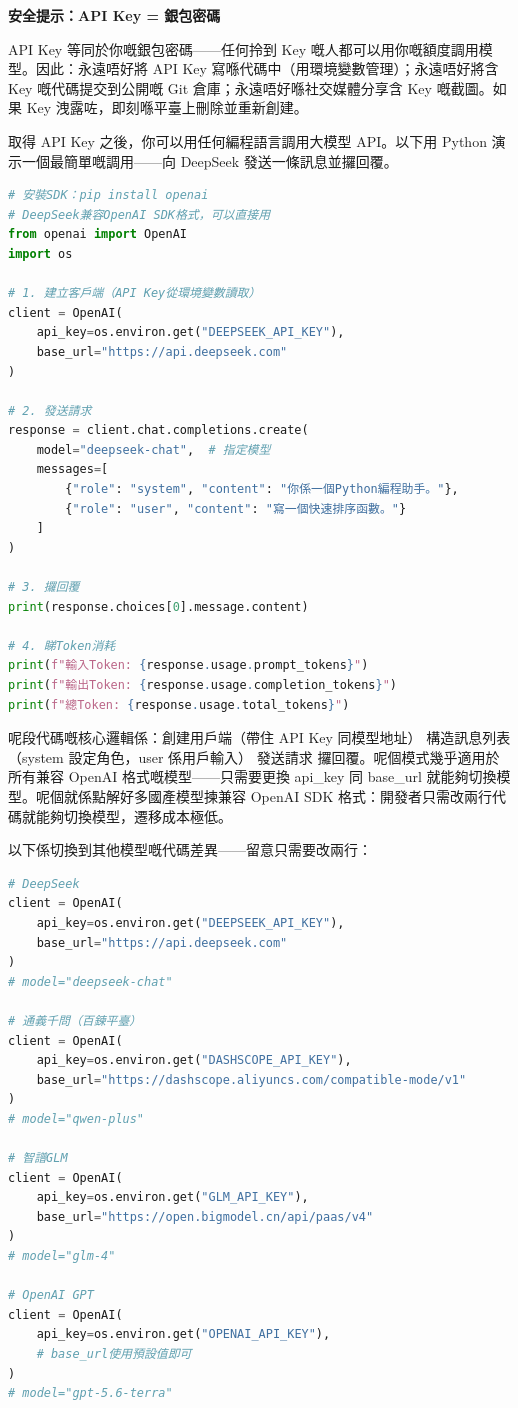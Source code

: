 \textbf{安全提示：API Key = 銀包密碼}\par

API Key 等同於你嘅銀包密碼——任何拎到 Key 嘅人都可以用你嘅額度調用模型。因此：永遠唔好將 API Key 寫喺代碼中（用環境變數管理）；永遠唔好將含 Key 嘅代碼提交到公開嘅 Git 倉庫；永遠唔好喺社交媒體分享含 Key 嘅截圖。如果 Key 洩露咗，即刻喺平臺上刪除並重新創建。


取得 API Key 之後，你可以用任何編程語言調用大模型 API。以下用 Python 演示一個最簡單嘅調用——向 DeepSeek 發送一條訊息並攞回覆。

\begin{lstlisting}[language=Python]
# 安裝SDK：pip install openai
# DeepSeek兼容OpenAI SDK格式，可以直接用
from openai import OpenAI
import os

# 1. 建立客戶端（API Key從環境變數讀取）
client = OpenAI(
    api_key=os.environ.get("DEEPSEEK_API_KEY"),
    base_url="https://api.deepseek.com"
)

# 2. 發送請求
response = client.chat.completions.create(
    model="deepseek-chat",  # 指定模型
    messages=[
        {"role": "system", "content": "你係一個Python編程助手。"},
        {"role": "user", "content": "寫一個快速排序函數。"}
    ]
)

# 3. 攞回覆
print(response.choices[0].message.content)

# 4. 睇Token消耗
print(f"輸入Token: {response.usage.prompt_tokens}")
print(f"輸出Token: {response.usage.completion_tokens}")
print(f"總Token: {response.usage.total_tokens}")
\end{lstlisting}

呢段代碼嘅核心邏輯係：創建用戶端（帶住 API Key 同模型地址） 構造訊息列表（system 設定角色，user 係用戶輸入） 發送請求 攞回覆。呢個模式幾乎適用於所有兼容 OpenAI 格式嘅模型——只需要更換 api\_key 同 base\_url 就能夠切換模型。呢個就係點解好多國產模型揀兼容 OpenAI SDK 格式：開發者只需改兩行代碼就能夠切換模型，遷移成本極低。

以下係切換到其他模型嘅代碼差異——留意只需要改兩行：

\begin{lstlisting}[language=Python]
# DeepSeek
client = OpenAI(
    api_key=os.environ.get("DEEPSEEK_API_KEY"),
    base_url="https://api.deepseek.com"
)
# model="deepseek-chat"

# 通義千問（百鍊平臺）
client = OpenAI(
    api_key=os.environ.get("DASHSCOPE_API_KEY"),
    base_url="https://dashscope.aliyuncs.com/compatible-mode/v1"
)
# model="qwen-plus"

# 智譜GLM
client = OpenAI(
    api_key=os.environ.get("GLM_API_KEY"),
    base_url="https://open.bigmodel.cn/api/paas/v4"
)
# model="glm-4"

# OpenAI GPT
client = OpenAI(
    api_key=os.environ.get("OPENAI_API_KEY"),
    # base_url使用預設值即可
)
# model="gpt-5.6-terra"
\end{lstlisting}

